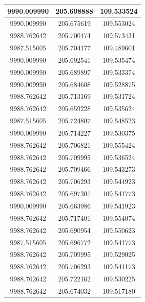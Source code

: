 \documentclass[a4paper,14pt]{article}
\begin{document}
\begin{longtable}[c]{|c|c|c|}
	9990.009990       & 205.698888           & 109.533524        \\ \hline
	9990.009990       & 205.675619           & 109.553024        \\ \hline
	9988.762642       & 205.700474           & 109.573431        \\ \hline
	9987.515605       & 205.704177           & 109.489601        \\ \hline
	9990.009990       & 205.692541           & 109.535474        \\ \hline
	9990.009990       & 205.689897           & 109.533374        \\ \hline
	9990.009990       & 205.684608           & 109.528875        \\ \hline
	9988.762642       & 205.713169           & 109.531724        \\ \hline
	9988.762642       & 205.659228           & 109.535624        \\ \hline
	9987.515605       & 205.724807           & 109.548523        \\ \hline
	9990.009990       & 205.714227           & 109.530375        \\ \hline
	9988.762642       & 205.706821           & 109.555424        \\ \hline
	9988.762642       & 205.709995           & 109.536524        \\ \hline
	9988.762642       & 205.709466           & 109.543273        \\ \hline
	9988.762642       & 205.706293           & 109.544923        \\ \hline
	9988.762642       & 205.697301           & 109.541773        \\ \hline
	9990.009990       & 205.663986           & 109.541923        \\ \hline
	9988.762642       & 205.717401           & 109.554074        \\ \hline
	9988.762642       & 205.690954           & 109.550623        \\ \hline
	9987.515605       & 205.696772           & 109.541773        \\ \hline
	9988.762642       & 205.709995           & 109.529025        \\ \hline
	9988.762642       & 205.706293           & 109.541173        \\ \hline
	9988.762642       & 205.722162           & 109.530225        \\ \hline
	9988.762642       & 205.674032           & 109.517180        \\ \hline

\end{longtable}
\end{document}
